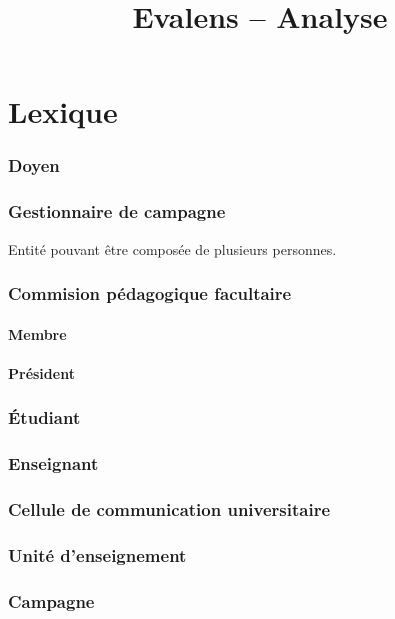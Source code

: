 \documentclass[a4paper,11pt]{report}
\title{Evalens -- Analyse}
\date{}
\begin{document}
\maketitle
\tableofcontents

\chapter{Lexique}

\subsection{Doyen}

\subsection{Gestionnaire de campagne}
Entité pouvant être composée de plusieurs personnes.

\subsection{Commision pédagogique facultaire}
\subsubsection{Membre}
\subsubsection{Président}

\subsection{Étudiant}

\subsection{Enseignant}

\subsection{Cellule de communication universitaire}

\subsection{Unité d'enseignement}

\subsection{Campagne}
\end{document}
